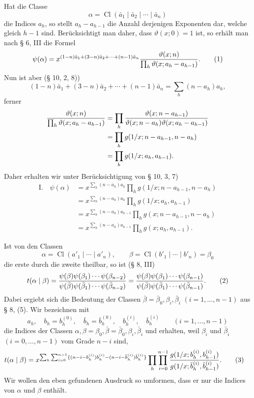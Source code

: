 \documentclass[11pt,a4paper]{article}
\newcommand{\Cl}{\operatorname{Cl}}
\begin{document}
Hat die Classe
\[
 \alpha=\Cl(\bar a_1\mid\bar a_2\mid\cdots\mid\bar a_n)
\]
die Indices $a_h$, so stellt $a_h-a_{h-1}$ die Anzahl derjenigen Exponenten dar, welche gleich $h-1$ sind. Berücksichtigt man daher, dass $\vartheta(x;0)=1$ ist, so erhält man nach § 6, III die Formel
\begin{equation}
 \psi(\alpha)=x^{(1-n)\bar a_1+(3-n)\bar a_2+\cdots+(n-1)\bar a_n}
 {\vartheta(x;n)\over\prod_h\vartheta(x;a_h-a_{h-1})}.
\tag{1}
\end{equation}
Nun ist aber (§ 10, 2, 8))
\[
 (1-n)\bar a_1+(3-n)\bar a_2+\cdots+(n-1)\bar a_n=\sum_h(n-a_h)a_h,
\]
ferner
\begin{align*}
 {\vartheta(x;n)\over\prod_h\vartheta(x;a_h-a_{h-1})}
 &=\prod_h {\vartheta(x;n-a_{h-1})\over\vartheta(x;n-a_h)\vartheta(x;a_h-a_{h-1})}\\
 &=\prod_h g(1/x;n-a_{h-1},n-a_h)\\
 &=\prod_h g(1/x;a_h,a_{h-1}).
\end{align*}
Daher erhalten wir unter Berücksichtigung von § 10, 3, 7)
\begin{align*}
\text{I.}\quad
\psi(\alpha)&=x^{\sum_h(n-a_h)a_h}\prod_h g(1/x;n-a_{h-1},n-a_h)\\
&=x^{\sum_h(n-a_h)a_h}\prod_h g(1/x;a_h,a_{h-1})\\
&=x^{\sum_h(n-a_h)a_{h-1}}\prod_h g(x;n-a_{h-1},n-a_h)\\
&=x^{\sum_h(n-a_h)a_{h-1}}\prod_h g(x;a_h,a_{h-1}).
\end{align*}

Ist von den Classen
\[
 \alpha=\Cl(a'_1\mid\cdots\mid a'_n),\qquad
 \beta=\Cl(b'_1\mid\cdots\mid b'_n)=\beta_0
\]
die erste durch die zweite theilbar, so ist (§ 8, III)
\begin{equation}
 t(\alpha\mid\beta)=
 {\psi(\beta)\psi(\beta_1)\cdots\psi(\beta_{n-2})
  \over
  \psi(\bar\beta)\psi(\bar\beta_1)\cdots\psi(\bar\beta_{n-2})}
 = {\psi(\beta)\psi(\beta_1)\cdots\psi(\beta_{n-1})
  \over
  \psi(\bar\beta)\psi(\bar\beta_1)\cdots\psi(\bar\beta_{n-1})}.
\tag{2}
\end{equation}
Dabei ergiebt sich die Bedeutung der Classen $\bar\beta=\bar\beta_0,\beta_i,\bar\beta_i$ $(i=1,\ldots,n-1)$ aus § 8, (5). Wir bezeichnen mit
\[
 a_h,
 \quad b_h=b_h^{(0)},\quad \bar b_h=\bar b_h^{(0)},
 \quad b_h^{(i)},\quad \bar b_h^{(i)}\qquad(i=1,\ldots,n-1)
\]
die Indices der Classen $\alpha,\beta=\beta_0,\bar\beta=\bar\beta_0,\beta_i,\bar\beta_i$ und erhalten, weil $\beta_i$ und $\bar\beta_i$ $(i=0,\ldots,n-1)$ vom Grade $n-i$ sind,
\begin{align}
 t(\alpha\mid\beta)
&=x^{\sum_h\sum_{i=0}^{n-1}\{(n-i-b_h^{(i)})b_h^{(i)}-(n-i-\bar b_h^{(i)})\bar b_h^{(i)}\}}
 \prod_h\prod_{i=0}^{n-1}
 {g(1/x;b_h^{(i)},b_{h-1}^{(i)})\over
 g(1/x;\bar b_h^{(i)},\bar b_{h-1}^{(i)})}.
\tag{3}
\end{align}
Wir wollen den eben gefundenen Ausdruck so umformen, dass er nur die Indices von $\alpha$ und $\beta$ enthält.
\end{document}
